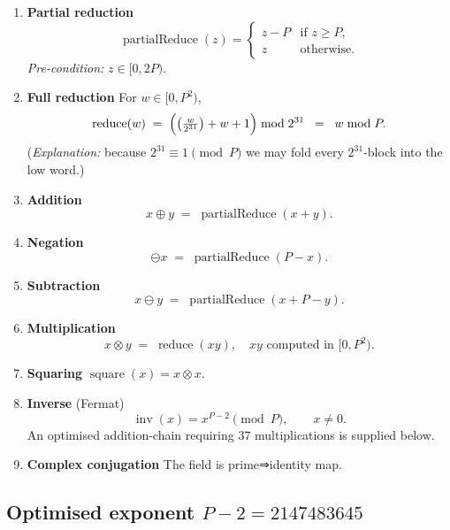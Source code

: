 \documentclass{article}
\begin{document}
\begin{enumerate}[label=\textbf{O\arabic*}.]
\item \textbf{Partial reduction}  
      \[
         \operatorname{partialReduce}(z)=
         \begin{cases}
             z-P &\text{if } z\ge P,\\[4pt]
             z   &\text{otherwise.}
         \end{cases}
      \]
      \textit{Pre-condition:} $z\in[0,2P)$.\medskip

\item \textbf{Full reduction}  
      For $w\in[0,P^{2})$,
      \[
        \operatorname{reduce}(w)
        \;=\;
        \Bigl(\bigl(\tfrac{w}{2^{31}}\bigr)+w+1\Bigr)
        \bmod 2^{31}
        \;\;=\;\;
        w \bmod P.
      \]
      (\emph{Explanation:} because $2^{31}\equiv1\pmod P$ we may
      fold every $2^{31}$-block into the low word.)\medskip

\item \textbf{Addition}  
      \[
        x\oplus y \;=\;
        \operatorname{partialReduce}(x+y).
      \]

\item \textbf{Negation}  
      \[
        \ominus x \;=\;
        \operatorname{partialReduce}(P-x).
      \]

\item \textbf{Subtraction}  
      \[
        x\ominus y
        \;=\;
        \operatorname{partialReduce}(x+P-y).
      \]

\item \textbf{Multiplication}  
      \[
        x\otimes y \;=\; \operatorname{reduce}(xy),
        \quad xy\text{ computed in }[0,P^{2}).
      \]

\item \textbf{Squaring} $\operatorname{square}(x)=x\otimes x$.

\item \textbf{Inverse} (Fermat)  
      \[
        \operatorname{inv}(x) = x^{P-2}\pmod P,
        \qquad x\neq0.
      \]
      An optimised addition-chain requiring $37$ multiplications is
      supplied below.\medskip

\item \textbf{Complex conjugation}  
      The field is prime\;⇒\;identity map.
\end{enumerate}

\subsection{Optimised exponent $P-2=2147483645$}
\end{document}
